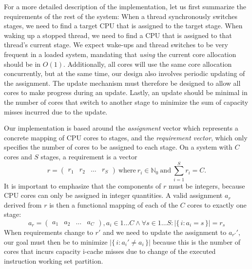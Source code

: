 \documentclass[12pt,a4paper]{book}
\begin{document}
For a more detailed description of the implementation, let us first summarize the requirements of the rest of the system:
When a thread synchronously switches stages, we need to find a target CPU that is assigned to the target stage.
When waking up a stopped thread, we need to find a CPU that is assigned to that thread's current stage.
We expect wake-ups and thread switches to be very frequent in a loaded system, mandating that \emph{using} the current core allocation should be in $O(1)$.
Additionally, all cores will use the same core allocation concurrently, but at the same time, our design also involves periodic updating of the assignment.
The update mechanism must therefore be designed to allow all cores to make progress during an update.
Lastly, an update should be minimal in the number of cores that switch to another stage to minimize the sum of capacity misses incurred due to the update.

Our implementation is based around the \emph{assignment} vector which represents a concrete mapping of CPU cores to stages, and the \emph{requirement vector}, which only specifies the number of cores to be assigned to each stage.
On a system with $C$ cores and $S$ stages, a requirement is a vector
    \[ r = \begin{pmatrix} r_1 & r_2 & \dots & r_S \end{pmatrix}\ \text{where}\ r_i \in \mathbb{N}_0 \ \text{and}\  \sum_{i = 1}^{S} r_i  = C. \]
It is important to emphasize that the components of $r$ must be integers, because CPU cores can only be assigned in integer quantities.
A valid assignment $a_r$ derived from $r$ is then a functional mapping of each of the $C$ cores to exactly one stage:
    \[ a_{r} = \begin{pmatrix} a_1 & a_2 & \dots & a_C \end{pmatrix}, a_i \in {1 \dots C} \wedge \forall s \in 1 \dots S : \vert\{\, i : a_i = s \, \} \vert = r_s \]
When requirements change to $r'$ and we need to update the assignment to $a_{r'}'$, our goal must then be to minimize ${\vert\{\, i : a_i' \ne a_i \,\}\vert}$ because this is the number of cores that incurs capacity i-cache misses due to change of the executed instruction working set partition.
\end{document}
